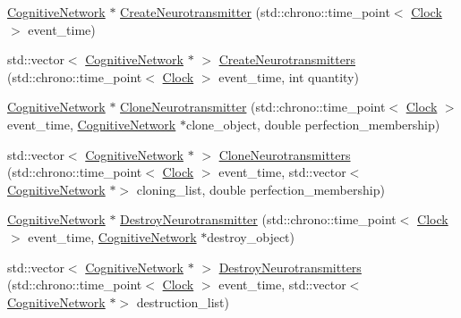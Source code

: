 \begin{DoxyCompactItemize}
\item 
\mbox{\hyperlink{classCognitiveNetwork}{Cognitive\+Network}} $\ast$ \mbox{\hyperlink{classNeuroreceptor_af671059884336eadbc367f9d8556eb3f}{Create\+Neurotransmitter}} (std\+::chrono\+::time\+\_\+point$<$ \mbox{\hyperlink{universe_8h_a0ef8d951d1ca5ab3cfaf7ab4c7a6fd80}{Clock}} $>$ event\+\_\+time)
\item 
std\+::vector$<$ \mbox{\hyperlink{classCognitiveNetwork}{Cognitive\+Network}} $\ast$ $>$ \mbox{\hyperlink{classNeuroreceptor_aa0037379ecb214ff982429e054f2a194}{Create\+Neurotransmitters}} (std\+::chrono\+::time\+\_\+point$<$ \mbox{\hyperlink{universe_8h_a0ef8d951d1ca5ab3cfaf7ab4c7a6fd80}{Clock}} $>$ event\+\_\+time, int quantity)
\item 
\mbox{\hyperlink{classCognitiveNetwork}{Cognitive\+Network}} $\ast$ \mbox{\hyperlink{classNeuroreceptor_a5629a3d463cc963138ff017ec499720d}{Clone\+Neurotransmitter}} (std\+::chrono\+::time\+\_\+point$<$ \mbox{\hyperlink{universe_8h_a0ef8d951d1ca5ab3cfaf7ab4c7a6fd80}{Clock}} $>$ event\+\_\+time, \mbox{\hyperlink{classCognitiveNetwork}{Cognitive\+Network}} $\ast$clone\+\_\+object, double perfection\+\_\+membership)
\item 
std\+::vector$<$ \mbox{\hyperlink{classCognitiveNetwork}{Cognitive\+Network}} $\ast$ $>$ \mbox{\hyperlink{classNeuroreceptor_af953abb478f4a3a1843b4b61f9969274}{Clone\+Neurotransmitters}} (std\+::chrono\+::time\+\_\+point$<$ \mbox{\hyperlink{universe_8h_a0ef8d951d1ca5ab3cfaf7ab4c7a6fd80}{Clock}} $>$ event\+\_\+time, std\+::vector$<$ \mbox{\hyperlink{classCognitiveNetwork}{Cognitive\+Network}} $\ast$$>$ cloning\+\_\+list, double perfection\+\_\+membership)
\item 
\mbox{\hyperlink{classCognitiveNetwork}{Cognitive\+Network}} $\ast$ \mbox{\hyperlink{classNeuroreceptor_a35beb8e355f9b567b327e9323f5552a0}{Destroy\+Neurotransmitter}} (std\+::chrono\+::time\+\_\+point$<$ \mbox{\hyperlink{universe_8h_a0ef8d951d1ca5ab3cfaf7ab4c7a6fd80}{Clock}} $>$ event\+\_\+time, \mbox{\hyperlink{classCognitiveNetwork}{Cognitive\+Network}} $\ast$destroy\+\_\+object)
\item 
std\+::vector$<$ \mbox{\hyperlink{classCognitiveNetwork}{Cognitive\+Network}} $\ast$ $>$ \mbox{\hyperlink{classNeuroreceptor_acd500abfb25bd08167b2002e85e8b788}{Destroy\+Neurotransmitters}} (std\+::chrono\+::time\+\_\+point$<$ \mbox{\hyperlink{universe_8h_a0ef8d951d1ca5ab3cfaf7ab4c7a6fd80}{Clock}} $>$ event\+\_\+time, std\+::vector$<$ \mbox{\hyperlink{classCognitiveNetwork}{Cognitive\+Network}} $\ast$$>$ destruction\+\_\+list)

\end{DoxyCompactItemize}
